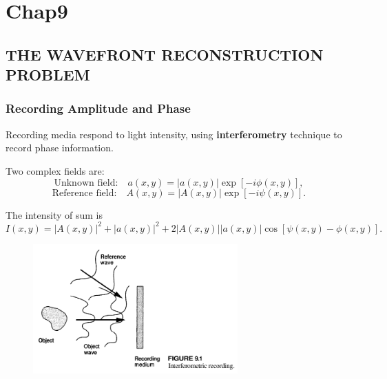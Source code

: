 \documentclass[en,hazy,device=normal,blue,14pt]{elegantnote}
\begin{document}
\section{Chap9}
\subsection{THE WAVEFRONT RECONSTRUCTION PROBLEM}
\subsubsection{Recording Amplitude and Phase}
Recording media respond to light intensity, using \textbf{interferometry} technique to record phase information.

Two complex fields are:
\begin{equation}
  \text{Unknown field:}\quad a\left( {x,y} \right) = \left| {a\left( {x,y} \right)} \right|\exp \left[ { - i\phi \left( {x,y} \right)} \right],
\end{equation}
\begin{equation}
  \text{Reference field:}\quad A\left( {x,y} \right) = \left| {A\left( {x,y} \right)} \right|\exp \left[ { - i\psi \left( {x,y} \right)} \right].
\end{equation}

The intensity of sum is 
\begin{equation}
  I\left( {x,y} \right) = {\left| {A\left( {x,y} \right)} \right|^2} + {\left| {a\left( {x,y} \right)} \right|^2} + 2\left| {A\left( {x,y} \right)} \right|\left| {a\left( {x,y} \right)} \right|\cos \left[ {\psi \left( {x,y} \right) - \phi \left( {x,y} \right)} \right].
\end{equation}
\begin{figure}[htbp]
  \centering
  \includegraphics[width=0.7\textwidth]{1.png}
\end{figure}
\end{document}

